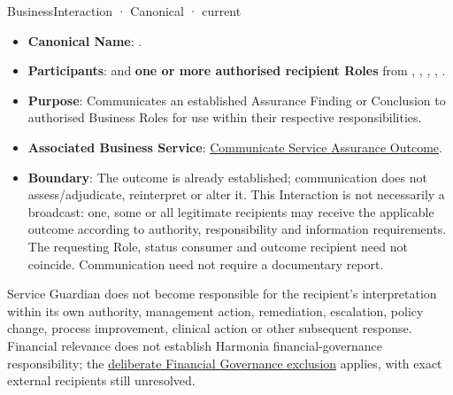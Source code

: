\label{element:73b6d1ab8ecc48c4bdea98f013288c9c}
{\small BusinessInteraction · Canonical · current}\par

\begin{itemize}


\item \textbf{Canonical Name}: \texttt{}.

\item \textbf{Participants}: \texttt{} and \textbf{one or more authorised recipient Roles} from \texttt{}, \texttt{}, \texttt{}, \texttt{}, \texttt{}.

\item \textbf{Purpose}: Communicates an established Assurance Finding or Conclusion to authorised Business Roles for use within their respective responsibilities.

\item \textbf{Associated Business Service}: \href{\detokenize{../../../../../docs/markdown/03-business-architecture/behaviours/health-service-assurance.md#communicate-service-assurance-outcome}}{Communicate Service Assurance Outcome}.

\item \textbf{Boundary}: The outcome is already established; communication does not assess/adjudicate, reinterpret or alter it. This Interaction is not necessarily a broadcast: one, some or all legitimate recipients may receive the applicable outcome according to authority, responsibility and information requirements. The requesting Role, status consumer and outcome recipient need not coincide. Communication need not require a documentary report.

\end{itemize}


Service Guardian does not become responsible for the recipient's interpretation within its own authority, management action, remediation, escalation, policy change, process improvement, clinical action or other subsequent response. Financial relevance does not establish Harmonia financial-governance responsibility; the \href{\detokenize{../../../../../docs/markdown/03-business-architecture/behaviours/health-service-assurance.md#financial-governance-exclusion}}{deliberate Financial Governance exclusion} applies, with exact external recipients still unresolved.


